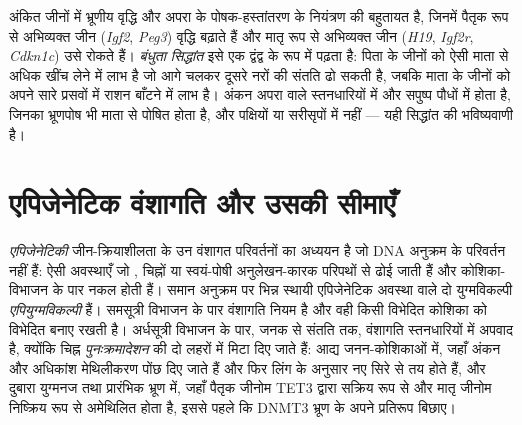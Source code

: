 \begin{remark}[अंकन क्यों]\label{rem:b3:chromatin-epigenetics:kinship}
अंकित जीनों में भ्रूणीय वृद्धि और अपरा के पोषक-हस्तांतरण के नियंत्रण
की बहुतायत है, जिनमें पैतृक रूप से अभिव्यक्त जीन (\emph{Igf2},
\emph{Peg3}) वृद्धि बढ़ाते हैं और मातृ रूप से अभिव्यक्त जीन
(\emph{H19}, \emph{Igf2r}, \emph{Cdkn1c}) उसे रोकते हैं। \emph{बंधुता
सिद्धांत} इसे एक द्वंद्व के रूप में पढ़ता है: पिता के जीनों को ऐसी
माता से अधिक खींच लेने में लाभ है जो आगे चलकर दूसरे नरों की संतति ढो
सकती है, जबकि माता के जीनों को अपने सारे प्रसवों में राशन बाँटने में
लाभ है। अंकन अपरा वाले स्तनधारियों में और सपुष्प पौधों में होता है,
जिनका भ्रूणपोष भी माता से पोषित होता है, और पक्षियों या सरीसृपों में
नहीं --- यही सिद्धांत की भविष्यवाणी है।
\end{remark}

\section{एपिजेनेटिक वंशागति और उसकी सीमाएँ}

\begin{definition}[एपिजेनेटिकी]\label{def:b3:chromatin-epigenetics:epigenetics}
\emph{एपिजेनेटिकी} जीन-क्रियाशीलता के उन वंशागत परिवर्तनों का अध्ययन है
जो DNA अनुक्रम के परिवर्तन नहीं हैं: ऐसी अवस्थाएँ जो ,
 चिह्नों या स्वयं-पोषी अनुलेखन-कारक परिपथों से ढोई जाती हैं और
कोशिका-विभाजन के पार नकल होती हैं। समान अनुक्रम पर भिन्न स्थायी
एपिजेनेटिक अवस्था वाले दो युग्मविकल्पी \emph{एपियुग्मविकल्पी} हैं।
समसूत्री विभाजन के पार वंशागति नियम है और वही किसी विभेदित कोशिका को
विभेदित बनाए रखती है। अर्धसूत्री विभाजन के पार, जनक से संतति तक,
वंशागति स्तनधारियों में अपवाद है, क्योंकि चिह्न \emph{पुनःक्रमादेशन}
की दो लहरों में मिटा दिए जाते हैं: आद्य जनन-कोशिकाओं में, जहाँ अंकन और
अधिकांश मेथिलीकरण पोंछ दिए जाते हैं और फिर लिंग के अनुसार नए सिरे से
तय होते हैं, और दुबारा युग्मनज तथा प्रारंभिक भ्रूण में, जहाँ पैतृक
जीनोम TET3 द्वारा सक्रिय रूप से और मातृ जीनोम निष्क्रिय रूप से
अमेथिलित होता है, इससे पहले कि DNMT3 भ्रूण के अपने प्रतिरूप बिछाए।
\end{definition}

